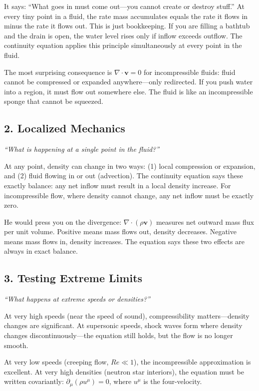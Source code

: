 It says: ``What goes in must come out---you cannot create or destroy stuff.'' At every tiny point in a fluid, the rate mass accumulates equals the rate it flows in minus the rate it flows out. This is just bookkeeping. If you are filling a bathtub and the drain is open, the water level rises only if inflow exceeds outflow. The continuity equation applies this principle simultaneously at every point in the fluid.

The most surprising consequence is $\nabla \cdot \mathbf{v} = 0$ for incompressible fluids: fluid cannot be compressed or expanded anywhere---only redirected. If you push water into a region, it must flow out somewhere else. The fluid is like an incompressible sponge that cannot be squeezed.

\subsection*{2. Localized Mechanics}
\textit{``What is happening at a single point in the fluid?''}

At any point, density can change in two ways: (1) local compression or expansion, and (2) fluid flowing in or out (advection). The continuity equation says these exactly balance: any net inflow must result in a local density increase. For incompressible flow, where density cannot change, any net inflow must be exactly zero.

He would press you on the divergence: $\nabla \cdot (\rho \mathbf{v})$ measures net outward mass flux per unit volume. Positive means mass flows out, density decreases. Negative means mass flows in, density increases. The equation says these two effects are always in exact balance.

\subsection*{3. Testing Extreme Limits}
\textit{``What happens at extreme speeds or densities?''}

At very high speeds (near the speed of sound), compressibility matters---density changes are significant. At supersonic speeds, shock waves form where density changes discontinuously---the equation still holds, but the flow is no longer smooth.

At very low speeds (creeping flow, $Re \ll 1$), the incompressible approximation is excellent. At very high densities (neutron star interiors), the equation must be written covariantly: $\partial_\mu (\rho u^\mu) = 0$, where $u^\mu$ is the four-velocity.


